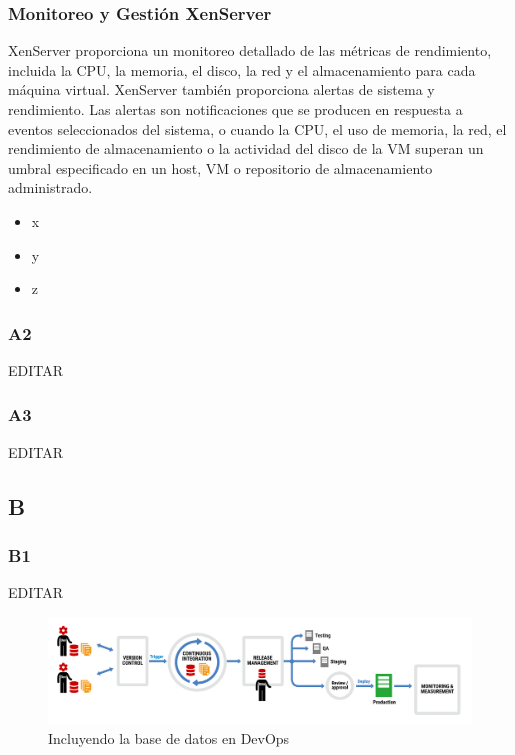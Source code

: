 \documentclass[preprint,12pt]{elsarticle}
\begin{document}
\subsubsection{\textbf{Monitoreo y Gestión XenServer}}
XenServer proporciona un monitoreo detallado de las métricas de rendimiento, incluida la CPU, la memoria, el disco, la red  y el almacenamiento para cada máquina virtual.
XenServer también proporciona alertas de sistema y rendimiento. Las alertas son notificaciones que se producen en respuesta a eventos seleccionados del sistema, o cuando la CPU, el uso de memoria, la red, el rendimiento de almacenamiento o la actividad del disco de la VM superan un umbral especificado en un host, VM o repositorio de almacenamiento administrado.\cite{Citrix2018}

\cite{Gartner} 

\begin{itemize}
	\item x
	\item y
	\item z
\end{itemize}

\subsubsection{\textbf{A2}}

EDITAR\\

\subsubsection{\textbf{A3}}

EDITAR\\



\subsection{\textbf{B}}

\subsubsection{\textbf{B1}}

EDITAR\\

\begin{figure}[htb]
	\begin{center}
		\includegraphics[width=14cm]{./IMAGENES/basededatos_1} 
		\caption{Incluyendo la base de datos en DevOps}
	\end{center}
\end{figure}
\end{document}
